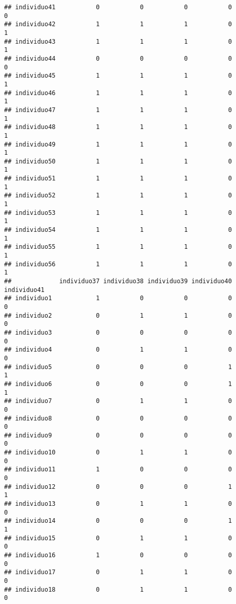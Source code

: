 \documentclass[
]{article}
\begin{document}
\begin{verbatim}
## individuo41           0           0           0           0           0
## individuo42           1           1           1           0           1
## individuo43           1           1           1           0           1
## individuo44           0           0           0           0           0
## individuo45           1           1           1           0           1
## individuo46           1           1           1           0           1
## individuo47           1           1           1           0           1
## individuo48           1           1           1           0           1
## individuo49           1           1           1           0           1
## individuo50           1           1           1           0           1
## individuo51           1           1           1           0           1
## individuo52           1           1           1           0           1
## individuo53           1           1           1           0           1
## individuo54           1           1           1           0           1
## individuo55           1           1           1           0           1
## individuo56           1           1           1           0           1
##             individuo37 individuo38 individuo39 individuo40 individuo41
## individuo1            1           0           0           0           0
## individuo2            0           1           1           0           0
## individuo3            0           0           0           0           0
## individuo4            0           1           1           0           0
## individuo5            0           0           0           1           1
## individuo6            0           0           0           1           1
## individuo7            0           1           1           0           0
## individuo8            0           0           0           0           0
## individuo9            0           0           0           0           0
## individuo10           0           1           1           0           0
## individuo11           1           0           0           0           0
## individuo12           0           0           0           1           1
## individuo13           0           1           1           0           0
## individuo14           0           0           0           1           1
## individuo15           0           1           1           0           0
## individuo16           1           0           0           0           0
## individuo17           0           1           1           0           0
## individuo18           0           1           1           0           0

\end{verbatim}
\end{document}

